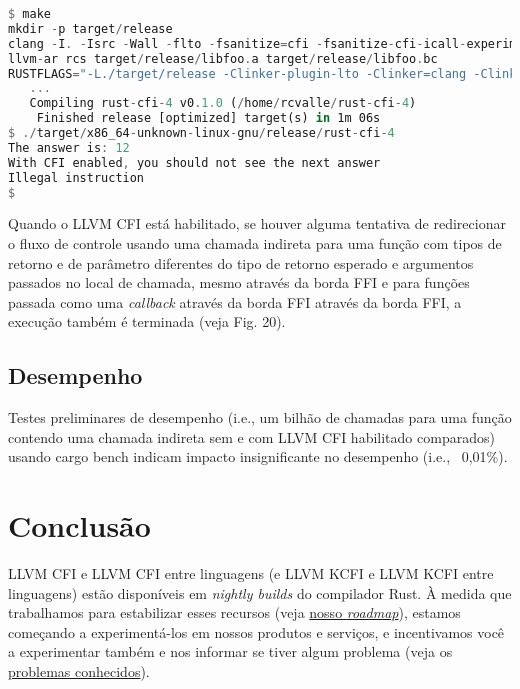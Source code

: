 \documentclass{article}
\begin{document}
\begin{lstlisting}[language=Rust, caption={Compilação e execução das Figs. 17–18 com LLVM CFI habilitado.}]
$ make
mkdir -p target/release
clang -I. -Isrc -Wall -flto -fsanitize=cfi -fsanitize-cfi-icall-experimental-normalize-integers -fvisibility=hidden -c -emit-llvm src/foo.c -o target/release/libfoo.bc
llvm-ar rcs target/release/libfoo.a target/release/libfoo.bc
RUSTFLAGS="-L./target/release -Clinker-plugin-lto -Clinker=clang -Clink-arg=-fuse-ld=lld -Zsanitizer=cfi -Zsanitizer-cfi-normalize-integers" cargo build -Zbuild-std -Zbuild-std-features --release --target x86_64-unknown-linux-gnu
   ...
   Compiling rust-cfi-4 v0.1.0 (/home/rcvalle/rust-cfi-4)
    Finished release [optimized] target(s) in 1m 06s
$ ./target/x86_64-unknown-linux-gnu/release/rust-cfi-4
The answer is: 12
With CFI enabled, you should not see the next answer
Illegal instruction
$
\end{lstlisting}

Quando o LLVM CFI está habilitado, se houver alguma tentativa de redirecionar o fluxo de controle usando uma chamada indireta para uma função com tipos de retorno e de parâmetro diferentes do tipo de retorno esperado e argumentos passados no local de chamada, mesmo através da borda FFI e para funções passada como uma \textit{callback} através da borda FFI através da borda FFI, a execução também é terminada (veja Fig. 20).

\subsection{Desempenho}

Testes preliminares de desempenho (i.e., um bilhão de chamadas para uma função contendo uma chamada indireta sem e com LLVM CFI habilitado comparados) usando cargo bench indicam impacto insignificante no desempenho (i.e., ~0,01\%).


\section{Conclusão}

LLVM CFI e LLVM CFI entre linguagens (e LLVM KCFI e LLVM KCFI entre linguagens) estão disponíveis em \textit{nightly builds} do compilador Rust. À medida que trabalhamos para estabilizar esses recursos (veja \href{https://hackmd.io/@rcvalle/S1Ou9K6H6}{nosso \textit{roadmap}}), estamos começando a experimentá-los em nossos produtos e serviços, e incentivamos você a experimentar também e nos informar se tiver algum problema (veja os \href{https://github.com/rust-lang/rust/issues?q=is:open+label:PG-exploit-mitigations+CFI} {problemas conhecidos}).
\end{document}
